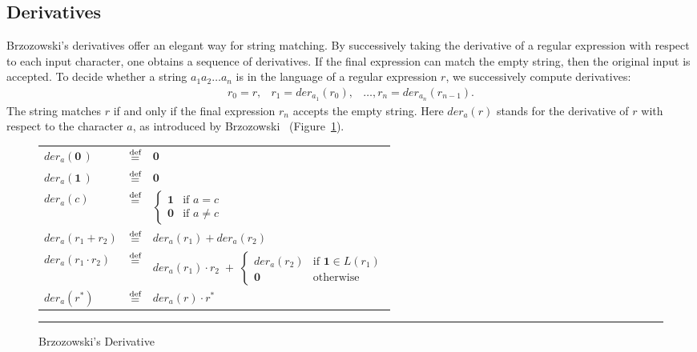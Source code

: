 \documentclass[12pt]{article}
\newcommand{\dn}{\ensuremath{\stackrel{\mbox{\scriptsize def}}{=}}}
\newcommand{\ZERO}{\textbf{0}}
\newcommand{\ONE}{\textbf{1}}
\newcommand{\der}{\textit{der}}
\begin{document}
\FloatBarrier
\subsection{Derivatives}

Brzozowski’s derivatives offer an elegant way for string matching. By successively taking the derivative of a regular
expression with respect to each input character, one obtains a sequence of derivatives. If the final expression can match 
the empty string, then the original input is accepted.
To decide whether a string $a_1 a_2 \dots a_n$ is in the language of a regular expression $r$, we successively 
compute derivatives:
\[
\begin{array}{rcl}
r_0 = r,& r_1 = \der_{a_1}(r_0),& \dots, r_n = \der_{a_n}(r_{n-1}) .
\end{array}
\]
The string matches $r$ if and only if the final expression $r_n$ accepts the empty string. Here $\der_a(r)$ stands for the derivative of $r$ with respect to the character
$a$, as introduced by Brzozowski~\cite{Brzozowski1964} (Figure~\ref{BrzozowskiDerivative}).

\begin{figure}[ht]
  \begin{center}

  \renewcommand{\arraystretch}{1.5}
  \begin{tabular}{lcl}
    $\der_a(\ZERO\,)$            & \dn & $\ZERO$ \\
    $\der_a(\ONE\,)$             & \dn & $\ZERO$ \\
    $\der_a(c)$                  & \dn &
      $\begin{cases}
        \ONE  & \text{if } a = c \\
        \ZERO & \text{if } a \neq c
      \end{cases}$ \\
    $\der_a(r_1 + r_2)$          & \dn & $\der_a(r_1) + \der_a(r_2)$ \\
    $\der_a(r_1 \cdot r_2)$      & \dn &
      $\der_a(r_1) \cdot r_2 \;+\;
        \begin{cases}
          \der_a(r_2) & \text{if } \ONE \in L(r_1) \\
          \ZERO       & \text{otherwise}
        \end{cases}$ \\
    $\der_a(r^\ast)$             & \dn & $\der_a(r) \cdot r^\ast$
  \end{tabular}
  \renewcommand{\arraystretch}{1.0}
    
    \mbox{}
    \rule{\linewidth}{0.4pt}
  \caption{Brzozowski’s Derivative}\label{BrzozowskiDerivative}
  \end{center}
\end{figure}
\end{document}
